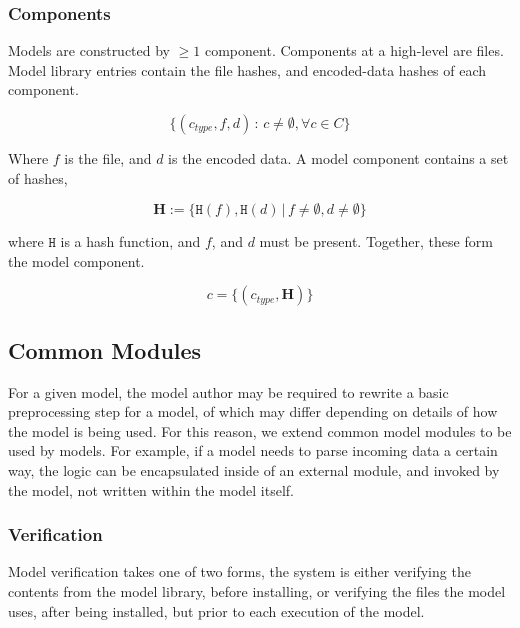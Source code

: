\documentclass[10pt, titlepage, twocolumn]{report}
\begin{document}
\subsubsection{Components}
Models are constructed by \(\geq 1\) component. Components at a high-level are files. Model library entries contain the file hashes, and encoded-data hashes of each component.

\begin{equation}
\{ (c_{type},  f, d) \, : \, c \ne \emptyset, \forall c \in C \}
\end{equation}

Where \(f\) is the file, and \(d\) is the encoded data. A model component contains a set of hashes, 

\begin{equation}
\boldsymbol{H} := \{ \texttt{H}(f), \texttt{H}(d) \, \vert \, f \ne \emptyset , d \ne \emptyset \}
\end{equation}

where \(\texttt{H}\) is a hash function, and \(f\), and \(d\) must be present. Together, these form the model component.



\begin{equation}
c = \{ (c_{type},  \boldsymbol{H} ) \}
\end{equation}


\subsection{Common Modules}
For a given model, the model author may be required to rewrite a basic preprocessing step for a model, of which may differ depending on details of how the model is being used. For this reason, we extend common model modules to be used by models. For example, if a model needs to parse incoming data a certain way, the logic can be encapsulated inside of an external module, and invoked by the model, not written within the model itself.




\subsubsection{Verification}
Model verification takes one of two forms, the system is either verifying the contents from the model library, before installing, or verifying the files the model uses, after being installed, but prior to each execution of the model.
\end{document}
